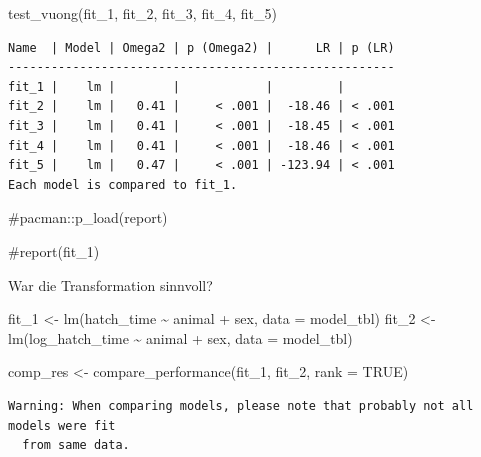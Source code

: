 \documentclass[
  letterpaper,
]{scrbook}
\newenvironment{Shaded}{\begin{snugshade}}{\end{snugshade}}
\newcommand{\AttributeTok}[1]{\textcolor[rgb]{0.40,0.45,0.13}{#1}}
\newcommand{\CommentTok}[1]{\textcolor[rgb]{0.37,0.37,0.37}{#1}}
\newcommand{\ConstantTok}[1]{\textcolor[rgb]{0.56,0.35,0.01}{#1}}
\newcommand{\FunctionTok}[1]{\textcolor[rgb]{0.28,0.35,0.67}{#1}}
\newcommand{\NormalTok}[1]{\textcolor[rgb]{0.00,0.23,0.31}{#1}}
\newcommand{\OtherTok}[1]{\textcolor[rgb]{0.00,0.23,0.31}{#1}}
\newcommand{\SpecialCharTok}[1]{\textcolor[rgb]{0.37,0.37,0.37}{#1}}
\begin{document}
\begin{Shaded}
\begin{Highlighting}[]
\FunctionTok{test\_vuong}\NormalTok{(fit\_1, fit\_2, fit\_3, fit\_4, fit\_5)}
\end{Highlighting}
\end{Shaded}

\begin{verbatim}
Name  | Model | Omega2 | p (Omega2) |      LR | p (LR)
------------------------------------------------------
fit_1 |    lm |        |            |         |       
fit_2 |    lm |   0.41 |     < .001 |  -18.46 | < .001
fit_3 |    lm |   0.41 |     < .001 |  -18.45 | < .001
fit_4 |    lm |   0.41 |     < .001 |  -18.46 | < .001
fit_5 |    lm |   0.47 |     < .001 | -123.94 | < .001
Each model is compared to fit_1.
\end{verbatim}

\begin{Shaded}
\begin{Highlighting}[]
\CommentTok{\#pacman::p\_load(report)}

\CommentTok{\#report(fit\_1)}
\end{Highlighting}
\end{Shaded}

War die Transformation sinnvoll?

\begin{Shaded}
\begin{Highlighting}[]
\NormalTok{fit\_1 }\OtherTok{\textless{}{-}} \FunctionTok{lm}\NormalTok{(hatch\_time }\SpecialCharTok{\textasciitilde{}}\NormalTok{ animal }\SpecialCharTok{+}\NormalTok{ sex, }\AttributeTok{data =}\NormalTok{ model\_tbl)}
\NormalTok{fit\_2 }\OtherTok{\textless{}{-}} \FunctionTok{lm}\NormalTok{(log\_hatch\_time }\SpecialCharTok{\textasciitilde{}}\NormalTok{ animal }\SpecialCharTok{+}\NormalTok{ sex, }\AttributeTok{data =}\NormalTok{ model\_tbl)}
\end{Highlighting}
\end{Shaded}

\begin{Shaded}
\begin{Highlighting}[]
\NormalTok{comp\_res }\OtherTok{\textless{}{-}} \FunctionTok{compare\_performance}\NormalTok{(fit\_1, fit\_2, }\AttributeTok{rank =} \ConstantTok{TRUE}\NormalTok{)}
\end{Highlighting}
\end{Shaded}

\begin{verbatim}
Warning: When comparing models, please note that probably not all models were fit
  from same data.
\end{verbatim}
\end{document}
